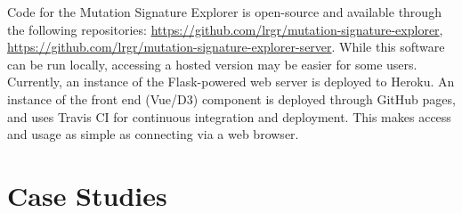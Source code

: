 \documentclass[12pt, letterpaper]{article}
\begin{document}
Code for the Mutation Signature Explorer is open-source and available through the following repositories: \url{https://github.com/lrgr/mutation-signature-explorer}, \url{https://github.com/lrgr/mutation-signature-explorer-server}.
While this software can be run locally, accessing a hosted version may be easier for some users.
Currently, an instance of the Flask-powered web server is deployed to Heroku.
An instance of the front end (Vue/D3) component is deployed through GitHub pages, and uses Travis CI for continuous integration and deployment.
This makes access and usage as simple as connecting via a web browser.


\section{Case Studies}
\end{document}
